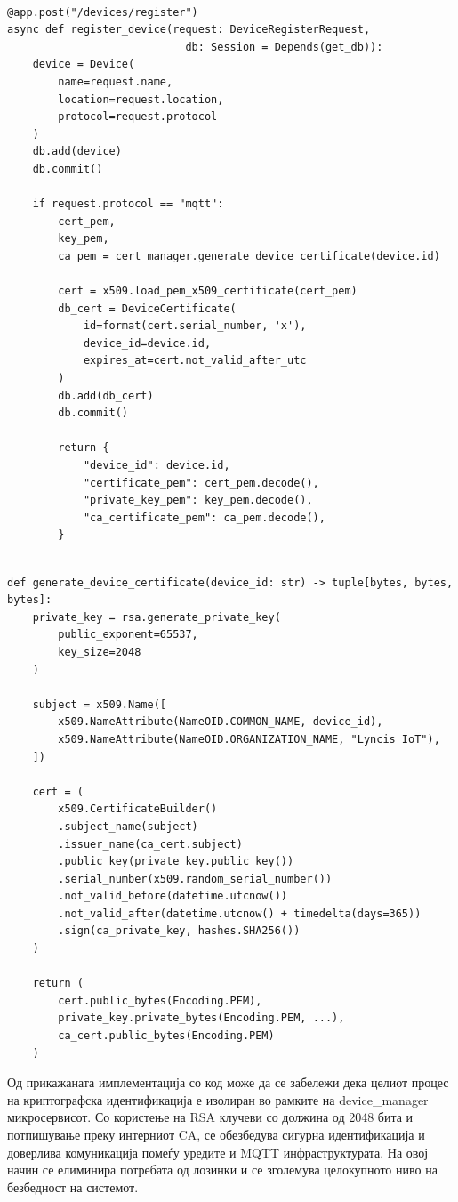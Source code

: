 \begin{verbatim}

@app.post("/devices/register")
async def register_device(request: DeviceRegisterRequest,
                            db: Session = Depends(get_db)):
    device = Device(
        name=request.name, 
        location=request.location,
        protocol=request.protocol
    )
    db.add(device)
    db.commit()
    
    if request.protocol == "mqtt":
        cert_pem,
        key_pem,
        ca_pem = cert_manager.generate_device_certificate(device.id)
        
        cert = x509.load_pem_x509_certificate(cert_pem)
        db_cert = DeviceCertificate(
            id=format(cert.serial_number, 'x'),
            device_id=device.id,
            expires_at=cert.not_valid_after_utc
        )
        db.add(db_cert)
        db.commit()
        
        return {
            "device_id": device.id,
            "certificate_pem": cert_pem.decode(),
            "private_key_pem": key_pem.decode(),
            "ca_certificate_pem": ca_pem.decode(),
        }

\end{verbatim}
\begin{verbatim}

def generate_device_certificate(device_id: str) -> tuple[bytes, bytes, bytes]:
    private_key = rsa.generate_private_key(
        public_exponent=65537,
        key_size=2048
    )
    
    subject = x509.Name([
        x509.NameAttribute(NameOID.COMMON_NAME, device_id),
        x509.NameAttribute(NameOID.ORGANIZATION_NAME, "Lyncis IoT"),
    ])
    
    cert = (
        x509.CertificateBuilder()
        .subject_name(subject)
        .issuer_name(ca_cert.subject)
        .public_key(private_key.public_key())
        .serial_number(x509.random_serial_number())
        .not_valid_before(datetime.utcnow())
        .not_valid_after(datetime.utcnow() + timedelta(days=365))
        .sign(ca_private_key, hashes.SHA256())
    )
    
    return (
        cert.public_bytes(Encoding.PEM),
        private_key.private_bytes(Encoding.PEM, ...),
        ca_cert.public_bytes(Encoding.PEM)
    )
\end{verbatim}

Од прикажаната имплементација со код може да се забележи дека целиот процес
на криптографска идентификација е изолиран во рамките на device\_manager
микросервисот. Со користење на RSA клучеви со должина од 2048 бита и
потпишување преку интерниот CA, се обезбедува сигурна идентификација и
доверлива комуникација помеѓу уредите и MQTT инфраструктурата. На овој
начин се елиминира потребата од лозинки и се зголемува целокупното ниво
на безбедност на системот.

